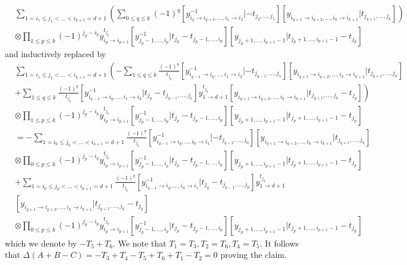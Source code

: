 \begin{align*}
&\sum_{1=i_1\leq j_1<\dots<i_{k+1}=d+1}\left(\sum_{0\leq q\leq k}(-1)^q[y_{i_q\to i_{q+1},\dots,i_1\to i_2}^{-1}|-t_{j_q,\dots,j_1}][y_{i_{q+1}\to i_{q+2},\dots,i_k\to i_{k+1}}|t_{j_{q+1},\dots,j_k}]\right)\\
&\otimes\prod_{1\leq p\leq k}(-1)^{j_p-i_p}y_{i_p\to i_{p+1}}^{t_{j_p}}[y_{j_p-1,\dots,i_p}^{-1}|t_{j_p}-t_{j_p-1,\dots,i_p}][y_{j_p+1,\dots,i_{p+1}-1}|t_{j_p+1,\dots,i_{p+1}-1}-t_{j_p}]
\end{align*}
and inductively replaced by
\begin{align*}
&\sum_{1=i_1\leq j_1<\dots<i_{k+1}=d+1}\left(-\sum_{1\leq q\leq k}\frac{(-1)^q}{t_{j_q}}[y_{i_{q-1}\to i_q,\dots,i_1\to i_2}^{-1}|-t_{j_{q-1},\dots,j_1}][y_{i_{q+1}\to i_{q+2},\dots,i_k\to i_{k+1}}|t_{j_{q+1},\dots,j_k}]\right.\\
&+\left.\sum_{1\leq q\leq k}\frac{(-1)^q}{t_{j_q}}[y_{i_{q-1}\to i_q,\dots,i_1\to i_2}^{-1}|t_{j_q}-t_{j_{q-1},\dots,j_1}]y_{1\to d+1}^{t_{j_q}}[y_{i_{q+1}\to i_{q+2},\dots,i_k\to i_{k+1}}|t_{j_{q+1},\dots,j_k}-t_{j_q}]\right)\\
&\otimes\prod_{1\leq p\leq k}(-1)^{j_p-i_p}y_{i_p\to i_{p+1}}^{t_{j_p}}[y_{j_p-1,\dots,i_p}^{-1}|t_{j_p}-t_{j_p-1,\dots,i_p}][y_{j_p+1,\dots,i_{p+1}-1}|t_{j_p+1,\dots,i_{p+1}-1}-t_{j_p}]\\
&=-\sum_{1=i_0\leq j_0<\dots<i_{k+1}=d+1}\frac{(-1)^q}{t_{j_q}}[y_{i_{q-1}\to i_q,\dots,i_0\to i_1}^{-1}|-t_{j_{q-1},\dots,j_0}][y_{i_{q+1}\to i_{q+2},\dots,i_k\to i_{k+1}}|t_{j_{q+1},\dots,j_k}]\\
&\otimes\prod_{0\leq p\leq k}(-1)^{j_p-i_p}y_{i_p\to i_{p+1}}^{t_{j_p}}[y_{j_p-1,\dots,i_p}^{-1}|t_{j_p}-t_{j_p-1,\dots,i_p}][y_{j_p+1,\dots,i_{p+1}-1}|t_{j_p+1,\dots,i_{p+1}-1}-t_{j_p}]\\
&+\sum_{1=i_0\leq j_0<\dots<i_{k+1}=d+1}\frac{(-1)^q}{t_{j_q}}[y_{i_{q-1}\to i_q,\dots,i_0\to i_1}^{-1}|t_{j_q}-t_{j_{q-1},\dots,j_0}]y_{1\to d+1}^{t_{j_q}}\\
&[y_{i_{q+1}\to i_{q+2},\dots,i_k\to i_{k+1}}|t_{j_{q+1},\dots,j_k}-t_{j_q}]\\
&\otimes\prod_{0\leq p\leq k}(-1)^{j_p-i_p}y_{i_p\to i_{p+1}}^{t_{j_p}}[y_{j_p-1,\dots,i_p}^{-1}|t_{j_p}-t_{j_p-1,\dots,i_p}][y_{j_p+1,\dots,i_{p+1}-1}|t_{j_p+1,\dots,i_{p+1}-1}-t_{j_p}]
\end{align*}
which we denote by $-T_5+T_6$. We note that $T_1=T_3,T_2=T_6,T_4=T_5$. It follows that $\Delta(A+B-C)=-T_3+T_4-T_5+T_6+T_1-T_2=0$ proving the claim.
